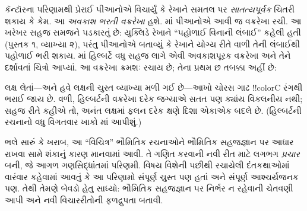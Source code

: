 \documentclass[../../../include/open-logic-section]{subfiles}
\begin{document}
કૅન્ટૉરના પરિણામથી પ્રેરાઈ પીઆનોએ
વિચાર્યું કે રેખાને સમતલ પર
\emph{સાતત્યપૂર્વક} ચિતરી શકાય કે કેમ.
આ \emph{અવકાશ ભરતી વક્રરેખા}
હશે. \citeyear{Peano1890}માં
પીઆનોએ આવી જ વક્રરેખા
રચી. આ ખરેખર સહજ
સમજને પડકારતું છે:
યુક્લિડે રેખાને
“પહોળાઈ વિનાની
લંબાઈ” કહેલી હતી
(પુસ્તક ૧, વ્યાખ્યા ૨),
પરંતુ પીઆનોએ બતાવ્યું
કે રેખાને યોગ્ય રીતે
વાળી તેની લંબાઈથી
પહોળાઈ ભરી શકાય.
\citeyear{Hilbert1891}માં
હિલ્બર્ટે વધુ સહજ
લાગે એવી અવકાશપૂરક
વક્રરેખા અને તેને
દર્શાવતાં ચિત્રો આપ્યાં.
આ વક્રરેખા ક્રમશઃ
રચાય છે; તેના
પ્રથમ છ તબક્કા
અહીં છે:
\begin{center}
\end{center}
લક્ષ લેતાં—અને હવે લક્ષની ચુસ્ત
વ્યાખ્યા મળી ગઈ છે—આખો
ચોરસ ગાઢ !!{colorC} રંગથી
ભરાઈ જાય છે. વળી,
હિલ્બર્ટની વક્રરેખા
દરેક જગ્યાએ સતત પણ
ક્યાંય વિકલનીય નથી;
સહજ રીતે કહીએ તો,
અનંત લક્ષમાં ફલન
દરેક ક્ષણે દિશા
એકાએક બદલે છે.
(હિલ્બર્ટની રચનાનો
વધુ વિગતવાર ખાકો
માં
આપીશું.)

ભલે સારું કે ખરાબ, આ “વિચિત્ર”
ભૌમિતિક રચનાઓને ભૌમિતિક
સહજજ્ઞાન પર આધાર રાખવા
સામે શંકાનું કારણ માનવામાં
આવી. તે ગણિત કરવાની
નવી રીત માટે લગભગ
\emph{પ્રચાર} બની,
જે આગળ ગણસિદ્ધાંતમાં
પરિણમી. વિષય વિશેની
પછીથી રચાયેલી
દંતકથાઓમાં વારંવાર
કહેવામાં આવતું કે
આ પરિણામો સંપૂર્ણ
ચુસ્ત પણ હતાં અને
સંપૂર્ણ આશ્ચર્યજનક
પણ. તેથી તેમણે
બેવડો હેતુ સાધ્યો:
ભૌમિતિક સહજજ્ઞાન
પર નિર્ભર ન રહેવાની
ચેતવણી આપી અને
નવી વિચારરીતોની
ફળદ્રુપતા બતાવી.
\end{document}
